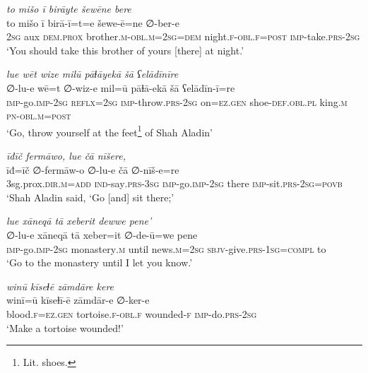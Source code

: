 \ea \label{DG.26}
\textit{to mišo ī birāyte šewēne bere} \\ 
\gll to mišo ī birā-ī=t=e šewe-ē=ne ∅-ber-e \\ 
 \textsc{2sg} aux \textsc{dem.prox} brother\textsc{.m}\textsc{-obl}\textsc{.m}\textsc{=\textsc{2sg}}\textsc{=dem} night\textsc{\textsc{.f}}\textsc{-obl}\textsc{\textsc{.f}}\textsc{=\textsc{post}} \textsc{imp-}take\textsc{.prs}-\textsc{2sg} \\ 
\glt `You should take this brother of yours [there] at night.'
\z 
 
\ea \label{DG.27}
\textit{lue wēt wize milū pāɫāyekā šā ʕelādīnīre} \\ 
\gll ∅-lu-e wē=t ∅-wiz-e mil=ū pāɫā-ekā šā ʕelādīn-ī=re \\ 
 \textsc{imp-}go.\textsc{imp-}\textsc{2sg} \textsc{reflx}\textsc{=\textsc{2sg}} \textsc{imp-}throw\textsc{.prs}-\textsc{2sg} on\textsc{=ez}\textsc{.gen} shoe\textsc{-def}\textsc{.obl}\textsc{.pl} king\textsc{.m} \textsc{pn}\textsc{-obl}\textsc{.m}\textsc{=\textsc{post}} \\ 
\glt `Go, throw yourself at the feet\footnote{Lit. shoes.} of Shah Aladin'
\z 
 
\ea \label{DG.44}
\textit{īđīč fermāwo, lue čā nīšere,} \\ 
\gll īđ=īč ∅-fermāw-o ∅-lu-e čā ∅-nīš-e=re \\ 
 3sg.prox\textsc{.dir}\textsc{.m}\textsc{=add} \textsc{ind-}say\textsc{.prs}\textsc{-3sg} \textsc{imp-}go.\textsc{imp-}\textsc{2sg} there \textsc{imp-}sit\textsc{.prs}-\textsc{2sg}\textsc{=\textsc{povb}} \\ 
\glt `Shah Aladin  said, ‘Go [and] sit there;'
\z 
 
\ea \label{DG.45}
\textit{lue xāneqā tā xeberit dewwe pene’} \\ 
\gll ∅-lu-e xāneqā tā xeber=it ∅-de-ū=we pene \\ 
 \textsc{imp-}go.\textsc{imp-}\textsc{2sg} monastery\textsc{.m} until news\textsc{.m}\textsc{=\textsc{2sg}} \textsc{sbjv-}give\textsc{.prs}\textsc{-1sg}\textsc{=\textsc{compl}} to \\ 
\glt `Go to the monastery until I let you know.'
\z 
 
\ea \label{DG.49}
\textit{winū kīseɫē zāmdāre kere} \\ 
\gll winī=ū kīseɫī-ē zāmdār-e ∅-ker-e \\ 
 blood\textsc{\textsc{.f}}\textsc{=ez}\textsc{.gen} tortoise\textsc{\textsc{.f}}\textsc{-obl}\textsc{\textsc{.f}} wounded\textsc{-f} \textsc{imp-}do\textsc{.prs}-\textsc{2sg} \\ 
\glt `Make a tortoise wounded!'
\z 
 
